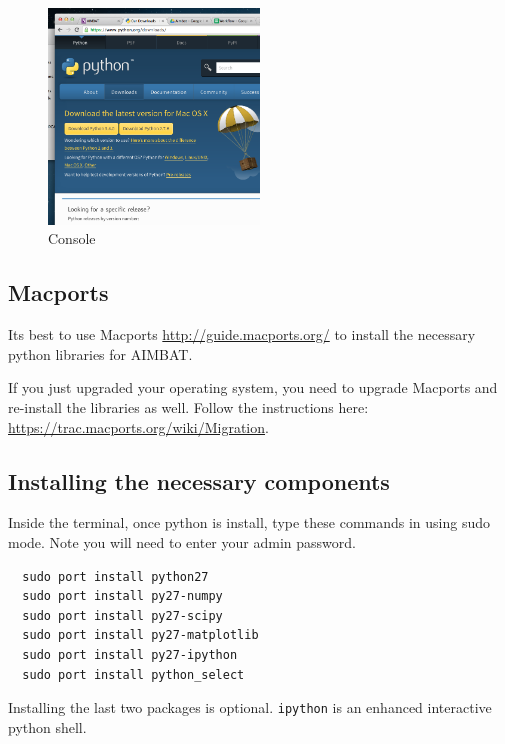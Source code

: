 \documentclass[letterpaper,10pt]{article}
\begin{document}
\begin{figure}[h!]
  \centering
  \includegraphics[width=0.5\textwidth]{images/python_version}
  \caption{Console}
  \label{fig:python_version}
\end{figure}


\subsection{Macports}

Its best to use Macports \url{http://guide.macports.org/} to install the necessary python libraries for AIMBAT. 

If you just upgraded your operating system, you need to upgrade Macports and re-install the libraries as well. Follow the instructions here: \url{https://trac.macports.org/wiki/Migration}.


\subsection{Installing the necessary components}

Inside the terminal, once python is install, type these commands in using sudo mode. Note you will need to enter your admin password.

\begin{verbatim}
  sudo port install python27
  sudo port install py27-numpy
  sudo port install py27-scipy
  sudo port install py27-matplotlib
  sudo port install py27-ipython
  sudo port install python_select
\end{verbatim}

Installing the last two packages is optional. \verb"ipython" is an enhanced interactive python shell.
\end{document}
